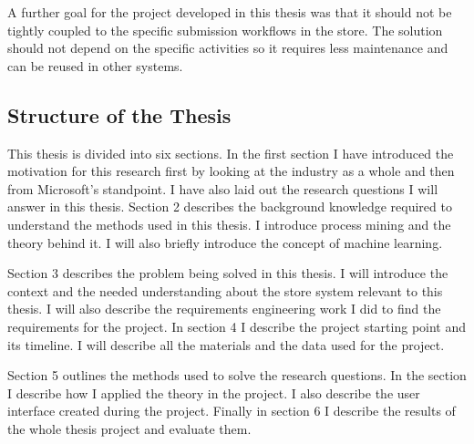 A further goal for the project developed in this thesis was that it should not be tightly coupled to the 
specific submission workflows in the store. The solution should not depend on the specific activities so
it requires less maintenance and can be reused in other systems.

\subsection{Structure of the Thesis}
This thesis is divided into six sections. In the first section I have introduced the motivation for this research first by looking at the industry as a whole and then from Microsoft's standpoint.
I have also laid out the research questions I will answer in this thesis.
Section 2 describes the background knowledge required to understand the methods used in this thesis.
I introduce process mining and the theory behind it. I will also briefly introduce the concept of machine learning.

Section 3 describes the problem being solved in this thesis. I will introduce the context and the needed understanding about the store system relevant to this thesis. 
I will also describe the requirements engineering work I did to find the requirements for the project.
In section 4 I describe the project starting point and its timeline.
I will describe all the materials and the data used for the project.

Section 5 outlines the methods used to solve the research questions.
In the section I describe how I applied the theory in the project.
I also describe the user interface created during the project.
Finally in section 6 I describe the results of the whole thesis project and evaluate them.
